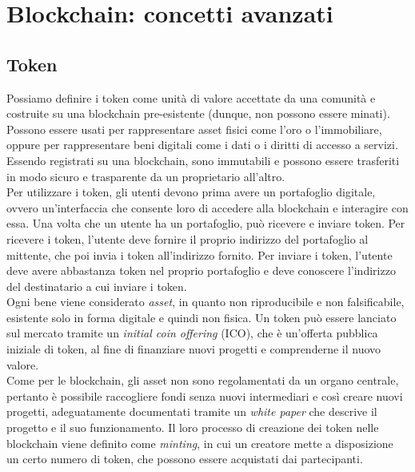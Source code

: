 \section{Blockchain: concetti avanzati}\label{sec:tecnologie-blockchain-avanzate}

\subsection{Token}\label{sec:tecnologie-blockchain-avanzate-token}
Possiamo definire i token come unità di valore accettate da una comunità e costruite su una blockchain pre-esistente (dunque, non possono essere minati).
Possono essere usati per rappresentare asset fisici come l'oro o l'immobiliare, oppure per rappresentare beni digitali 
come i dati o i diritti di accesso a servizi. Essendo registrati su una blockchain, sono immutabili e possono essere trasferiti in modo sicuro e trasparente da un proprietario all'altro. \\

Per utilizzare i token, gli utenti devono prima avere un portafoglio digitale, ovvero un'interfaccia che consente loro 
di accedere alla blockchain e interagire con essa. Una volta che un utente ha un portafoglio, 
può ricevere e inviare token. Per ricevere i token, l'utente deve fornire il proprio indirizzo del portafoglio al mittente, 
che poi invia i token all'indirizzo fornito. Per inviare i token, l'utente deve avere abbastanza token nel proprio portafoglio e deve conoscere l'indirizzo del destinatario a cui inviare i token. \\

Ogni bene viene considerato \textit{asset}, in quanto non riproducibile e non falsificabile, esistente solo in forma digitale e quindi non fisica. 
Un token può essere lanciato sul mercato tramite un \textit{initial coin offering} (ICO),
che è un'offerta pubblica iniziale di token, al fine di finanziare nuovi progetti e comprenderne il nuovo valore.
\\ 
Come per le blockchain, gli asset non sono regolamentati da un organo centrale, pertanto è possibile raccogliere fondi senza nuovi intermediari e così creare
nuovi progetti, adeguatamente documentati tramite un \textit{white paper} che descrive il progetto e il suo funzionamento. 
Il loro processo di creazione dei token nelle blockchain viene definito come \textit{minting}, in cui un creatore mette a disposizione un certo numero di token,
che possono essere acquistati dai partecipanti. \\

